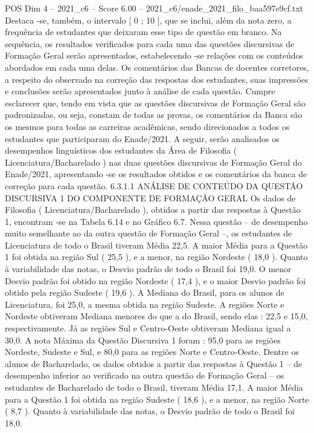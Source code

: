 \begin{textsample}{POS Dim 4 – 2021\_c6 – Score 6.00 – 2021\_c6/enade\_2021\_filo\_baa597e9cf.txt}
Destaca -se, também, o intervalo [ 0 ; 10 ], que se inclui, além da nota zero, a frequência de estudantes que deixaram esse tipo de questão em branco.
Na sequência, os resultados verificados para cada uma das questões discursivas de Formação Geral serão apresentados, estabelecendo -se relações com os conteúdos abordados em cada uma delas.
Os comentários das Bancas de docentes corretores, a respeito do observado na correção das respostas dos estudantes, suas impressões e conclusões serão apresentados junto à análise de cada questão.
Cumpre esclarecer que, tendo em vista que as questões discursivas de Formação Geral são padronizadas, ou seja, constam de todas as provas, os comentários da Banca são os mesmos para todas as carreiras acadêmicas, sendo direcionados a todos os estudantes que participaram do Enade/2021.
A seguir, serão analisados os desempenhos linguísticos dos estudantes da Área de Filosofia ( Licenciatura/Bacharelado ) nas duas questões discursivas de Formação Geral do Enade/2021, apresentando -se os resultados obtidos e os comentários da banca de correção para cada questão. 6.3.1.1 ANÁLISE DE CONTEÚDO DA QUESTÃO DISCURSIVA 1 DO COMPONENTE DE FORMAÇÃO GERAL Os dados de Filosofia ( Licenciatura/Bacharelado ), obtidos a partir das respostas à Questão 1, encontram -se na Tabela 6.14 e no Gráfico 6.7.
Nessa questão – de desempenho muito semelhante ao da outra questão de Formação Geral –, os estudantes de Licenciatura de todo o Brasil tiveram Média 22,5.
A maior Média para a Questão 1 foi obtida na região Sul ( 25,5 ), e a menor, na região Nordeste ( 18,0 ).
Quanto à variabilidade das notas, o Desvio padrão de todo o Brasil foi 19,0.
O menor Desvio padrão foi obtido na região Nordeste ( 17,4 ), e o maior Desvio padrão foi obtido pela região Sudeste ( 19,6 ).
A Mediana do Brasil, para os alunos de Licenciatura, foi 25,0, a mesma obtida na região Sudeste.
A regiões Norte e Nordeste obtiveram Mediana menores do que a do Brasil, sendo elas : 22,5 e 15,0, respectivamente.
Já as regiões Sul e Centro-Oeste obtiveram Mediana igual a 30,0.
A nota Máxima da Questão Discursiva 1 foram : 95,0 para as regiões Nordeste, Sudeste e Sul, e 80,0 para as regiões Norte e Centro-Oeste.
Dentre os alunos de Bacharelado, os dados obtidos a partir das respostas à Questão 1 – de desempenho inferior ao verificado na outra questão de Formação Geral – os estudantes de Bacharelado de todo o Brasil, tiveram Média 17,1.
A maior Média para a Questão 1 foi obtida na região Sudeste ( 18,6 ), e a menor, na região Norte ( 8,7 ).
Quanto à variabilidade das notas, o Desvio padrão de todo o Brasil foi 18,0.

\end{textsample}
